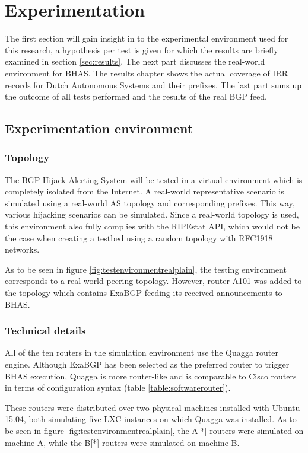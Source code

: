 \chapter{Experimentation}\label{ch:experimentation}
The first section will gain insight in to the experimental environment used for this research, a hypothesis per test is given for which the results are briefly examined in section \ref{sec:results}. The next part discusses the real-world environment for BHAS. The results chapter shows the actual coverage of IRR records for Dutch Autonomous Systems and their prefixes. The last part sums up the outcome of all tests performed and the results of the real BGP feed.  

\section{Experimentation environment}\label{sec:experimentalenvironment}
\subsection{Topology}\label{subsec:topology}
The BGP Hijack Alerting System will be tested in a virtual environment which is completely isolated from the Internet. A real-world representative scenario is simulated using a real-world AS topology and corresponding prefixes. This way, various hijacking scenarios can be simulated. Since a real-world topology is used, this environment also fully complies with the RIPEstat API, which would not be the case when creating a testbed using a random topology with RFC1918 networks.\par
As to be seen in figure \ref{fig:testenvironmentrealplain}, the testing environment corresponds to a real world peering topology. However, router A101 was added to the topology which contains ExaBGP feeding its received announcements to BHAS.

\subsection{Technical details}\label{subsec:technicaldetails}
All of the ten routers in the simulation environment use the Quagga router engine. Although ExaBGP has been selected as the preferred router to trigger BHAS execution, Quagga is more router-like and is comparable to Cisco routers in terms of configuration syntax (table \ref{table:softwarerouter}).\par
These routers were distributed over two physical machines installed with Ubuntu 15.04, both simulating five LXC instances on which Quagga was installed. As to be seen in figure \ref{fig:testenvironmentrealplain}, the A[*] routers were simulated on machine A, while the B[*] routers were simulated on machine B.\par

